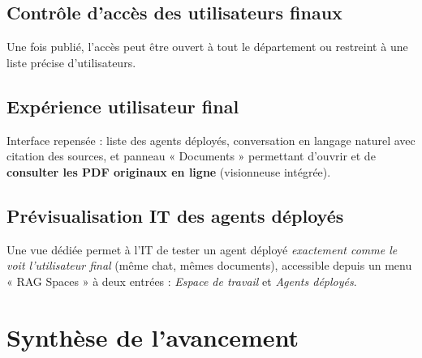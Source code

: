 \documentclass[11pt,a4paper]{article}
\begin{document}
\subsection{Contrôle d'accès des utilisateurs finaux}
Une fois publié, l'accès peut être ouvert à tout le département ou restreint à
une liste précise d'utilisateurs.

\subsection{Expérience utilisateur final}
Interface repensée : liste des agents déployés, conversation en langage naturel
avec citation des sources, et panneau « Documents » permettant d'ouvrir et de
\textbf{consulter les PDF originaux en ligne} (visionneuse intégrée).

\subsection{Prévisualisation IT des agents déployés}
Une vue dédiée permet à l'IT de tester un agent déployé \emph{exactement comme le
voit l'utilisateur final} (même chat, mêmes documents), accessible depuis un menu
« RAG Spaces » à deux entrées : \emph{Espace de travail} et \emph{Agents
déployés}.

\section{Synthèse de l'avancement}
\end{document}
